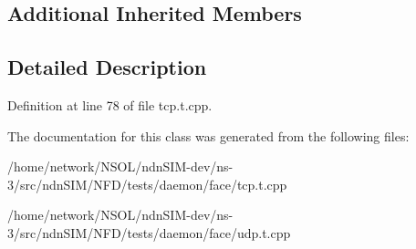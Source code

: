 \subsection*{Additional Inherited Members}


\subsection{Detailed Description}


Definition at line 78 of file tcp.\+t.\+cpp.



The documentation for this class was generated from the following files\+:\begin{DoxyCompactItemize}
\item 
/home/network/\+N\+S\+O\+L/ndn\+S\+I\+M-\/dev/ns-\/3/src/ndn\+S\+I\+M/\+N\+F\+D/tests/daemon/face/tcp.\+t.\+cpp\item 
/home/network/\+N\+S\+O\+L/ndn\+S\+I\+M-\/dev/ns-\/3/src/ndn\+S\+I\+M/\+N\+F\+D/tests/daemon/face/udp.\+t.\+cpp\end{DoxyCompactItemize}
